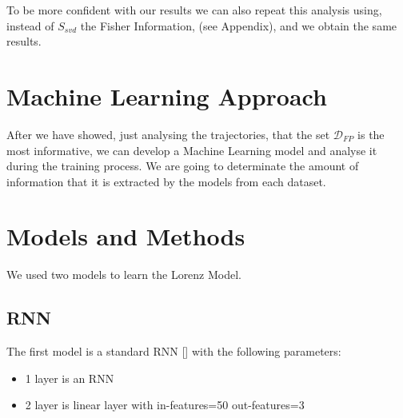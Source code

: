 \documentclass{article}
\begin{document}
To be more confident with our results we can also repeat this analysis using, instead of $S_{svd}$ the Fisher Information, (see Appendix), and we obtain the same results.

\newpage
\section{Machine Learning Approach}
After we have showed, just analysing the trajectories, that the set $\mathcal{D}_{FP}$ is the most informative, we can develop a Machine Learning model and analyse it during the training process. We are going to determinate the amount of information that it is extracted by the models from each dataset.
\section{Models and Methods}
We used two models to learn the Lorenz Model.
\subsection{RNN}
The first model is a standard RNN [\cite{rumelhart:errorpropnonote}] with the following parameters:
\begin{itemize}
    \item 1 layer is an RNN 
    \item 2 layer is linear layer with in-features=50 out-features=3
\end{itemize}
\end{document}
